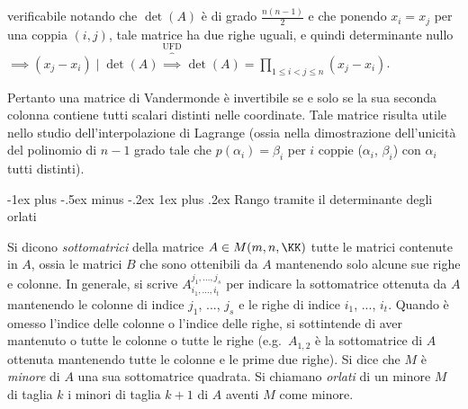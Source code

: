 \documentclass[10pt,landscape]{article}
\makeatletter
\renewcommand{\subsubsection}{\@startsection{subsubsection}{3}{0mm}%
	{-1ex plus -.5ex minus -.2ex}%
	{1ex plus .2ex}%
	{\normalfont\small\bfseries}}
\makeatother
\begin{document}
\begin{multicols}{3}
		verificabile notando che $\det(A)$ è di grado $\frac{n(n-1)}{2}$ e
		che ponendo $x_i = x_j$ per una coppia $(i, j)$, tale matrice
		ha due righe uguali, e quindi determinante nullo $\implies (x_j - x_i) \mid \det(A) \overbrace{\implies}^{\text{UFD}} \det(A) = \prod_{1 \leq i < j \leq n} (x_j - x_i) $.
		
		Pertanto una matrice di Vandermonde è invertibile se e solo se la sua
		seconda colonna contiene tutti scalari distinti nelle coordinate. Tale
		matrice risulta utile nello studio dell'interpolazione di Lagrange
		(ossia nella dimostrazione dell'unicità del polinomio di $n-1$ grado
		tale che $p(\alpha_i) = \beta_i$ per $i$ coppie ($\alpha_i$, $\beta_i$) con
		$\alpha_i$ tutti distinti).
		
		\subsubsection{Rango tramite il determinante degli orlati}
		
		Si dicono \textit{sottomatrici} della matrice $A \in M(m, n, \KK)$ tutte
		le matrici contenute in $A$, ossia le matrici $B$ che sono ottenibili da $A$
		mantenendo solo alcune sue righe e colonne. In generale, si scrive $A^{j_1, \ldots, j_s}_{i_1, \ldots, i_t}$ per indicare la sottomatrice ottenuta
		da $A$ mantenendo le colonne di indice $j_1$, ..., $j_s$ e le righe di
		indice $i_1$, ..., $i_t$. Quando è omesso l'indice delle colonne o l'indice
		delle righe, si sottintende di aver mantenuto o tutte le colonne o tutte le righe
		(e.g.~$A_{1,2}$ è la sottomatrice di $A$ ottenuta mantenendo tutte le colonne e
		le prime due righe). Si dice che $M$ è \textit{minore} di $A$ una sua sottomatrice quadrata. Si chiamano \textit{orlati} di un minore $M$ di taglia $k$ i minori di taglia $k+1$ di $A$ aventi $M$ come minore.
		

\end{multicols}
\end{document}
